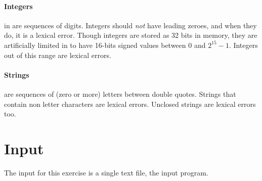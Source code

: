 \documentclass{article}
\begin{document}
\paragraph{Integers} in \plname are sequences of digits.
Integers should \textit{not} have leading zeroes,
and when they do, it is a lexical error.
Though integers are stored as 32 bits in memory,
they are artificially limited in \plname to have
16-bits signed values between $0$ and $2^{15}-1$.
Integers out of this range are lexical errors.
\paragraph{Strings} are sequences of (zero or more) letters between double quotes.
Strings that contain non letter characters are lexical errors.
Unclosed strings are lexical errors too.
\section{Input}
The input for this exercise is a single text file, the input \plname program.
\end{document}
